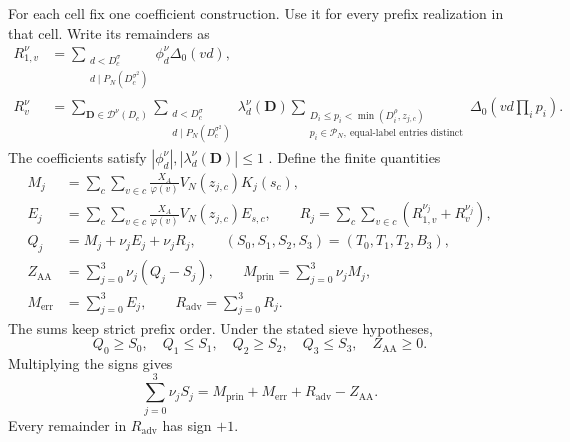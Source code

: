 For each cell fix one coefficient construction.
Use it for every prefix realization in that cell.
Write its remainders as
\begin{equation}\label{eq:l3-remainders}
\begin{aligned}
 R_{1,v}^{\nu}&=\sum_{\substack{d<D_c^\sigma\\d\mid P_N(D_c^{\sigma^2})}}
                         \phi_d^\nu\Delta_0(vd),\\
 R_v^\nu&=\sum_{\mathbf D\in\mathcal D^\nu(D_c)}
   \sum_{\substack{d<D_c^\sigma\\d\mid P_N(D_c^{\sigma^2})}}
   \lambda_d^\nu(\mathbf D)
   \sum_{\substack{D_i\le p_i<\min(D_i^\rho,z_{j,c})\\
                p_i\in\mathcal P_N,\ \text{equal-label entries distinct}}}
                         \Delta_0(vd\textstyle\prod_i p_i).
\end{aligned}
\end{equation}
The coefficients satisfy $|\phi_d^\nu|,|\lambda_d^\nu(\mathbf D)|\le1$
\cite[Theorem~2.6, (2.29)--(2.33b)]{PaperI}.
Define the finite quantities
\begin{equation}\label{eq:l3-four-rows}
\begin{aligned}
 M_j&=\sum_c\sum_{v\in c}\frac{X_A}{\varphi(v)}
                   V_N(z_{j,c})K_j(s_c),\\
 E_j&=\sum_c\sum_{v\in c}\frac{X_A}{\varphi(v)}
                   V_N(z_{j,c})E_{s,c},\qquad
 R_j=\sum_c\sum_{v\in c}(R_{1,v}^{\nu_j}+R_v^{\nu_j}),\\
 Q_j&=M_j+\nu_j E_j+\nu_j R_j,\qquad
 (S_0,S_1,S_2,S_3)=(T_0,T_1,T_2,B_3),\\
 Z_{\mathrm{AA}}&=\sum_{j=0}^3\nu_j(Q_j-S_j),\qquad
 M_{\mathrm{prin}}=\sum_{j=0}^3\nu_jM_j,\\
 M_{\mathrm{err}}&=\sum_{j=0}^3E_j,\qquad
 R_{\mathrm{adv}}=\sum_{j=0}^3R_j.
\end{aligned}
\end{equation}
The sums keep strict prefix order.
Under the stated sieve hypotheses,
\begin{equation}\label{eq:l3-signs}
 Q_0\ge S_0,\quad Q_1\le S_1,\quad
 Q_2\ge S_2,\quad Q_3\le S_3,\quad Z_{\mathrm{AA}}\ge0.
\end{equation}
Multiplying the signs gives
\begin{equation}\label{eq:l3-aa-id}
 \sum_{j=0}^3\nu_jS_j
    =M_{\mathrm{prin}}+M_{\mathrm{err}}+R_{\mathrm{adv}}-Z_{\mathrm{AA}}.
\end{equation}
Every remainder in $R_{\mathrm{adv}}$ has sign $+1$.


